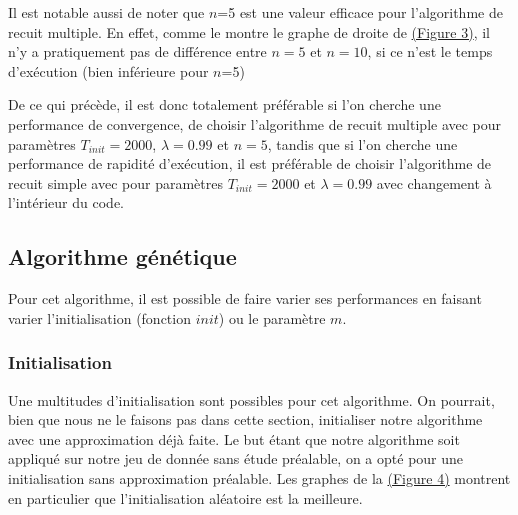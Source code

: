 \documentclass[11pt,french]{report}
\begin{document}
        Il est notable aussi de noter que $n$=5 est une valeur efficace pour l'algorithme de recuit multiple. En effet, comme le montre le graphe de droite de \hyperref[Figure3]{(Figure 3)}, il n'y a pratiquement pas de différence entre $n=5$ et $n=10$, si ce n'est le temps d'exécution (bien inférieure pour $n$=5)


        De ce qui précède, il est donc totalement préférable si l'on cherche une performance de convergence, de choisir l'algorithme de recuit multiple avec pour paramètres $T_{init} = 2000$,  $\lambda = 0.99$ et $n=5$, tandis que si l'on cherche une performance de rapidité d'exécution, il est préférable de choisir l'algorithme de recuit simple avec pour paramètres $T_{init} = 2000$ et $\lambda = 0.99$ avec changement à l'intérieur du code.


        \subsection{Algorithme génétique}
        Pour cet algorithme, il est possible de faire varier ses performances en faisant varier l'initialisation (fonction $init$) ou le paramètre \hyperref[sélection]{$m$}.

        \subsubsection{Initialisation}
        
        Une multitudes d'initialisation sont possibles pour cet algorithme. On pourrait, bien que nous ne le faisons pas dans cette section, initialiser notre algorithme avec une approximation déjà faite. Le but étant que notre algorithme soit appliqué sur notre jeu de donnée sans étude préalable, on a opté pour une initialisation sans approximation préalable. Les graphes de la \hyperref[Figure4]{(Figure 4)} montrent en particulier que l'initialisation aléatoire est la meilleure.
\end{document}
